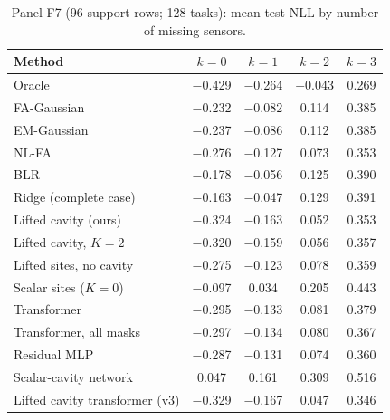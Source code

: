 \begin{table}[h]
\centering\small
\caption{\label{tab:moreF7}Panel F7 (96 support rows; 128 tasks): mean test NLL by number of missing sensors.}
\begin{tabular}{lcccc}
\toprule
Method & $k{=}0$ & $k{=}1$ & $k{=}2$ & $k{=}3$\\
\midrule
Oracle & $-$0.429 & $-$0.264 & $-$0.043 & 0.269\\
FA-Gaussian & $-$0.232 & $-$0.082 & 0.114 & 0.385\\
EM-Gaussian & $-$0.237 & $-$0.086 & 0.112 & 0.385\\
NL-FA & $-$0.276 & $-$0.127 & 0.073 & 0.353\\
BLR & $-$0.178 & $-$0.056 & 0.125 & 0.390\\
Ridge (complete case) & $-$0.163 & $-$0.047 & 0.129 & 0.391\\
Lifted cavity (ours) & $-$0.324 & $-$0.163 & 0.052 & 0.353\\
Lifted cavity, $K=2$ & $-$0.320 & $-$0.159 & 0.056 & 0.357\\
Lifted sites, no cavity & $-$0.275 & $-$0.123 & 0.078 & 0.359\\
Scalar sites ($K=0$) & $-$0.097 & 0.034 & 0.205 & 0.443\\
Transformer & $-$0.295 & $-$0.133 & 0.081 & 0.379\\
Transformer, all masks & $-$0.297 & $-$0.134 & 0.080 & 0.367\\
Residual MLP & $-$0.287 & $-$0.131 & 0.074 & 0.360\\
Scalar-cavity network & 0.047 & 0.161 & 0.309 & 0.516\\
Lifted cavity transformer (v3) & $-$0.329 & $-$0.167 & 0.047 & 0.346\\
\bottomrule
\end{tabular}
\end{table}

